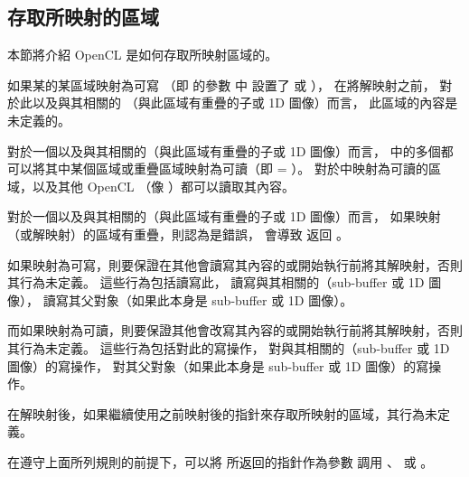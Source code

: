 \subsection{存取所映射的區域}

本節將介紹 OpenCL 是如何存取所映射區域的。

如果某的某區域映射為可寫
（即  的參數  中
設置了  或  ），
在將解映射之前，
對於此以及與其相關的
（與此區域有重疊的子或 1D 圖像）而言，
此區域的內容是未定義的。

對於一個以及與其相關的（與此區域有重疊的子或 1D 圖像）而言，
中的多個都可以將其中某個區域或重疊區域映射為可讀（即  = ）。
對於中映射為可讀的區域，以及其他 OpenCL （像  ）都可以讀取其內容。

對於一個以及與其相關的（與此區域有重疊的子或 1D 圖像）而言，
如果映射（或解映射）的區域有重疊，則認為是錯誤，
會導致  返回 。

如果映射為可寫，則要保證在其他會讀寫其內容的或開始執行前將其解映射，否則其行為未定義。
這些行為包括讀寫此，
讀寫與其相關的（sub-buffer 或 1D 圖像），
讀寫其父對象（如果此本身是 sub-buffer 或 1D 圖像）。

而如果映射為可讀，則要保證其他會改寫其內容的或開始執行前將其解映射，否則其行為未定義。
這些行為包括對此的寫操作，
對與其相關的（sub-buffer 或 1D 圖像）的寫操作，
對其父對象（如果此本身是 sub-buffer 或 1D 圖像）的寫操作。

在解映射後，如果繼續使用之前映射後的指針來存取所映射的區域，其行為未定義。

在遵守上面所列規則的前提下，可以將  所返回的指針作為參數  調用
 、
 或 。

